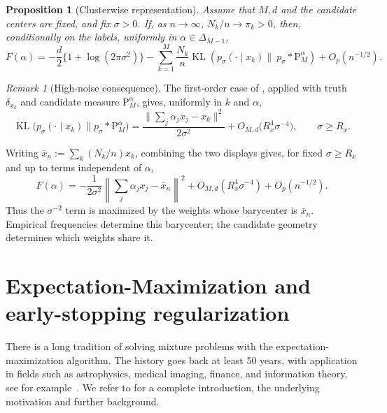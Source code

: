 \documentclass[12pt]{iopart}
\newtheorem{prop}{Proposition}
\theoremstyle{remark}
\newtheorem{rmk}{Remark}
\begin{document}
\begin{prop}[Clusterwise representation]
\label{prop: Replica}
Assume that $M,d$ and the candidate centers are fixed, and fix $\sigma>0$.
If, as $n\to\infty$, $N_k/n\to\pi_k>0$, then, conditionally on the labels,
uniformly in $\alpha\in\Delta_{M-1}$,
\begin{equation}
\label{eq:clusterwise-kl-representation}
F(\alpha)
=-\frac d2\{1+\log(2\pi\sigma^2)\}
-\sum_{k=1}^M\frac{N_k}{n}
\operatorname{KL}\!\left(p_\sigma(\cdot\mid x_k)\| \
p_\sigma*\mathrm P_M^\alpha\right)
+O_p(n^{-1/2}).
\end{equation}
\end{prop}




\begin{rmk}[High-noise consequence]
The first-order case of \citet[Theorem~2.1]{katsevich2023likelihood},
applied with truth
$\delta_{x_k}$ and candidate measure $\mathrm P_M^\alpha$, gives, uniformly
in $k$ and $\alpha$,
\begin{equation}
\label{eq:clusterwise-kl-high-noise}
\operatorname{KL} \big (p_\sigma(\cdot\mid x_k)\|
p_\sigma*\mathrm P_M^\alpha\big)
=\frac{\|\sum_j\alpha_jx_j-x_k\|^2}{2\sigma^2}
+O_{M,d}\big(R_x^4\sigma^{-4}\big),\qquad \sigma\geq R_x.
\end{equation}
\end{rmk}



Writing $\bar x_n:=\sum_k(N_k/n)x_k$, combining the two displays gives, for
fixed $\sigma\geq R_x$ and up to terms independent of $\alpha$,
\[
F(\alpha)
=-\frac{1}{2\sigma^2}
\left\|\sum_j\alpha_jx_j-\bar x_n\right\|^2
+O_{M,d}(R_x^4\sigma^{-4})+O_p(n^{-1/2}).
\]
Thus the $\sigma^{-2}$ term is maximized by the weights whose barycenter is
$\bar x_n$. Empirical frequencies determine this barycenter; the candidate
geometry determines which weights share it.



 \section{Expectation-Maximization and early-stopping regularization}
 \label{sec: EMSect}
There is a long tradition of solving mixture problems with the expectation-maximization algorithm. The history goes back at least 50 years, with application in fields such as astrophysics, medical imaging, finance, and information theory, see for example~\citet{lucy1974iterative, vardi1993, cover1984}. We refer to \citet{redner1984mixture,balakrishnan2017statistical} for a complete introduction, the underlying motivation and further background. 
\end{document}

